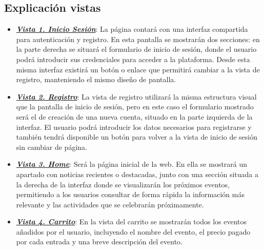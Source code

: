 \documentclass[12pt,a4paper]{article}
\begin{document}
\subsection{Explicación vistas}
\begin{itemize}
    \item \textbf{\textit{\hyperref[fig:vista1]{Vista 1. Inicio Sesión}}}: La página contará con una interfaz compartida para autenticación y registro. En esta pantalla se mostrarán dos secciones: en la parte derecha se situará el formulario de inicio de sesión, donde el usuario podrá introducir sus credenciales para acceder a la plataforma. Desde esta misma interfaz existirá un botón o enlace que permitirá cambiar a la vista de registro, manteniendo el mismo diseño de pantalla. 
    \item \textbf{\textit{\hyperref[fig:vista2]{Vista 2. Registro}}}: La vista de registro utilizará la misma estructura visual que la pantalla de inicio de sesión, pero en este caso el formulario mostrado será el de creación de una nueva cuenta, situado en la parte izquierda de la interfaz. El usuario podrá introducir los datos necesarios para registrarse y también tendrá disponible un botón para volver a la vista de inicio de sesión sin cambiar de página.
    \item \textbf{\textit{\hyperref[fig:vista3]{Vista 3. Home}}}: Será la página inicial de la web. En ella se mostrará un apartado con noticias recientes o destacadas, junto con una sección situada a la derecha de la interfaz donde se visualizarán los próximos eventos, permitiendo a los usuarios consultar de forma rápida la información más relevante y las actividades que se celebrarán próximamente.
    \item \textbf{\textit{\hyperref[fig:vista4]{Vista 4. Carrito}}}: En la vista del carrito se mostrarán todos los eventos añadidos por el usuario, incluyendo el nombre del evento, el precio pagado por cada entrada y una breve descripción del evento.
    

\end{itemize}
\end{document}
